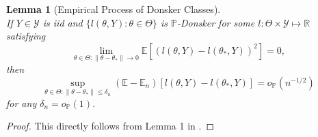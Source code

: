 \documentclass[12pt]{article}
\theoremstyle{myplain}
\newtheorem{lemma}{Lemma}[section]
\theoremstyle{definition}
\theoremstyle{definition}
\theoremstyle{remark}
\numberwithin{equation}{section}
\begin{document}
\begin{lemma}[Empirical Process of Donsker Classes]\label{lem:donsker}\ \\
If $Y\in\mathcal{Y}$ is iid and $\{l(\theta, Y): \theta\in\Theta\}$ is $\mathbb{P}$-Donsker for some $l:\Theta\times\mathcal{Y}\mapsto\mathbb{R}$ satisfying $$\lim_{\theta\in\Theta:\|\theta-\theta_*\|\to 0}\mathbb{E}\left[\left(l(\theta, Y)-l(\theta_*, Y)\right)^2\right] = 0,$$ then
$$\sup_{\theta\in\Theta: \|\theta-\theta_*\|\leq \delta_n} (\mathbb{E}-\mathbb{E}_n)[l(\theta, Y)-l(\theta_*, Y)] = o_\mathbb{P}(n^{-1/2})$$
for any $\delta_n=o_\mathbb{P}(1)$.
\end{lemma}
\begin{proof}
This directly follows from Lemma 1 in \cite{chen2003estimation}.
\end{proof}
\end{document}
